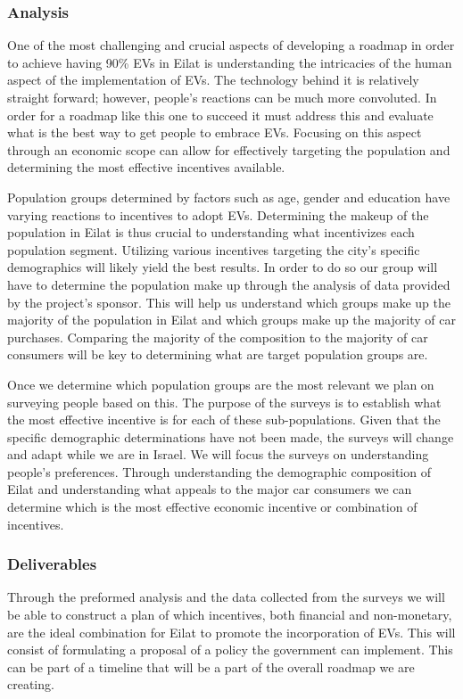 \documentclass{article}                         %
\begin{document}
\subsubsection{Analysis}
One of the most challenging and crucial aspects of developing a roadmap in order to achieve having 90\% EVs in Eilat is understanding the intricacies of the human aspect of the implementation of EVs. The technology behind it is relatively straight forward; however, people’s reactions can be much more convoluted. In order for a roadmap like this one to succeed it must address this and evaluate what is the best way to get people to embrace EVs. Focusing on this aspect through an economic scope can allow for effectively targeting the population and determining the most effective incentives available. 

Population groups determined by factors such as age, gender and education have varying reactions to incentives to adopt EVs. Determining the makeup of the population in Eilat is thus crucial to understanding what incentivizes each population segment. Utilizing various incentives targeting the city’s specific demographics will likely yield the best results. In order to do so our group will have to determine the population make up through the analysis of data provided by the project’s sponsor. This will help us understand which groups make up the majority of the population in Eilat and which groups make up the majority of car purchases. Comparing the majority of the composition to the majority of car consumers will be key to determining what are target population groups are.

Once we determine which population groups are the most relevant we plan on surveying people based on this. The purpose of the surveys is to establish what the most effective incentive is for each of these sub-populations. Given that the specific demographic determinations have not been made, the surveys will change and adapt while we are in Israel. We will focus the surveys on understanding  people's preferences. Through understanding the demographic composition of Eilat and understanding what appeals to the major car consumers we can determine which is the most effective economic incentive or combination of incentives. 

\subsubsection{Deliverables}
Through the preformed analysis and the data collected from the surveys we will be able to construct a plan of which incentives, both financial and non-monetary, are the ideal combination for Eilat to promote the incorporation of EVs. This will consist of formulating a proposal of a policy the government can implement. This can be part of a timeline that will be a part of the overall roadmap we are creating. 
\end{document}
